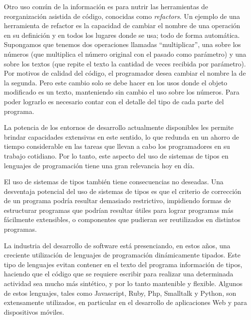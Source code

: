 \documentclass[a4paper,10pt]{article}
\begin{document}
Otro uso común de la información es para nutrir las herramientas de reorganización asistida de código, conocidas como \emph{refactors}\cite{Opdyke92a}.  
Un ejemplo de una herramienta de refactor es la capacidad de cambiar el nombre de una operación en su definición y en todos los lugares donde se usa; todo de forma automática. Supongamos que tenemos dos operaciones llamadas ``multiplicar'', una sobre los números (que multiplica el número original con el pasado como parámetro) y una sobre los textos (que repite el texto la cantidad de veces recibida por parámetro). Por motivos de calidad del código, el programador desea cambiar el nombre la de la segunda. Pero este cambio solo se debe hacer en los usos donde el objeto modificado es un texto, manteniendo sin cambio el uso sobre los números. Para poder lograrlo es necesario contar con el detalle del tipo de cada parte del programa. 

La potencia de los entornos de desarrollo actualmente disponibles les permite brindar capacidades extensivas en este sentido, lo que redunda en un ahorro de tiempo considerable en las tareas que llevan a cabo los programadores en su trabajo cotidiano. Por lo tanto, este aspecto del uso de sistemas de tipos en lenguajes de programación tiene una gran relevancia hoy en día.

El uso de sistemas de tipos también tiene consecuencias no deseadas\cite{klein12a,hanen10a}.
Una desventaja potencial del uso de sistemas de tipos es que el criterio de corrección de un programa podría resultar demasiado restrictivo, impidiendo formas de estructurar programas que podrían resultar útiles\cite{Card85c} para lograr programas más fácilmente extensibles, o componentes que pudieran ser reutilizados en distintos programas.

La industria del desarrollo de software está presenciando, en estos años, una creciente utilización de lenguajes de programación dinámicamente tipados. Este tipo de lenguajes evitan contener en el texto del programa información de tipos, haciendo que el código que se requiere escribir para realizar una determinada actividad sea mucho más sintético, y por lo tanto mantenible y flexible. 
Algunos de estos lenguajes, tales como Javascript, Ruby, Php, Smalltalk y Python, son extensamente utilizados, en particular en el desarrollo de aplicaciones Web y para dispositivos móviles.
\end{document}
